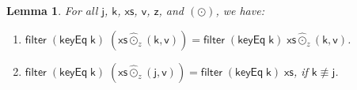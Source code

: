 \documentclass{article}
\newcommand{\Varid}[1]{\mathit{#1}}
\let\Varid\mathsf
\newtheorem{lemma}[theorem]{Lemma}
\begin{document}
\begin{lemma}
\label{lemma:filter-lift} For all \ensuremath{\Varid{j}}, \ensuremath{\Varid{k}}, \ensuremath{\Varid{xs}}, \ensuremath{\Varid{v}}, \ensuremath{\Varid{z}}, and \ensuremath{(\odot)}, we have:
\begin{enumerate}
  \item  \ensuremath{\Varid{filter}\;(\Varid{keyEq}\;\Varid{k})\;(\Varid{xs}\mathbin{\hat{\odot}_z}(\Varid{k},\Varid{v}))\mathrel{=}\Varid{filter}\;(\Varid{keyEq}\;\Varid{k})\;\Varid{xs}\mathbin{\hat{\odot}_z}(\Varid{k},\Varid{v})}.
  \item \ensuremath{\Varid{filter}\;(\Varid{keyEq}\;\Varid{k})\;(\Varid{xs}\mathbin{\hat{\odot}_z}(\Varid{j},\Varid{v}))\mathrel{=}\Varid{filter}\;(\Varid{keyEq}\;\Varid{k})\;\Varid{xs}}, if \ensuremath{\Varid{k}\not\equiv \Varid{j}}.
\end{enumerate}

\end{lemma}
\end{document}
